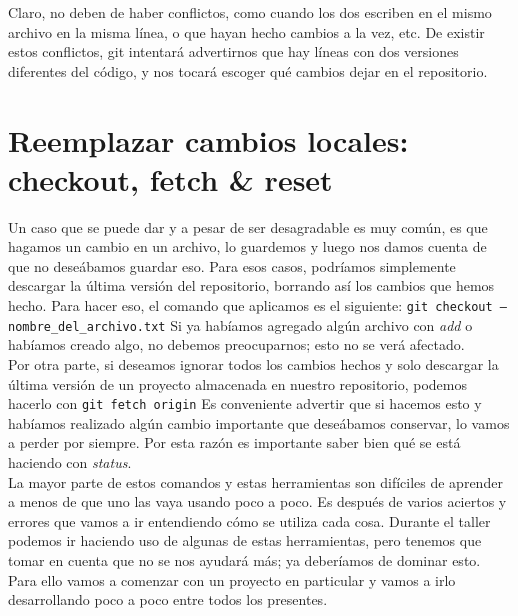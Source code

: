 \documentclass[10pt,letterpaper]{article}
\newcommand{\inlinecode}[1]{
\colorbox{light-gray}{\texttt{#1}}
}
\begin{document}
Claro, no deben de haber conflictos, como cuando los dos escriben en el mismo archivo en la misma l\'inea, o que hayan hecho cambios a la vez, etc. De existir estos conflictos, git intentar\'a advertirnos que hay l\'ineas con dos versiones diferentes del c\'odigo, y nos tocar\'a escoger qu\'e cambios dejar en el repositorio.

\section{Reemplazar cambios locales: checkout, fetch \& reset}
Un caso que se puede dar y a pesar de ser desagradable es muy com\'un, es que hagamos un cambio en un archivo, lo guardemos y luego nos damos cuenta de que no dese\'abamos guardar eso. Para esos casos, podr\'iamos simplemente descargar la \'ultima versi\'on del repositorio, borrando as\'i los cambios que hemos hecho. Para hacer eso, el comando que aplicamos es el siguiente: \inlinecode{git checkout -- nombre\_del\_archivo.txt} Si ya hab\'iamos agregado alg\'un archivo con \textit{add} o hab\'iamos creado algo, no debemos preocuparnos; esto no se ver\'a afectado.\\

Por otra parte, si deseamos ignorar todos los cambios hechos y solo descargar la \'ultima versi\'on de un proyecto almacenada en nuestro repositorio, podemos hacerlo con \inlinecode{git fetch origin} Es conveniente advertir que si hacemos esto y hab\'iamos realizado alg\'un cambio importante que dese\'abamos conservar, lo vamos a perder por siempre. Por esta raz\'on es importante saber bien qu\'e se est\'a haciendo con \textit{status}.\\

La mayor parte de estos comandos y estas herramientas son dif\'iciles de aprender a menos de que uno las vaya usando poco a poco. Es despu\'es de varios aciertos y errores que vamos a ir entendiendo c\'omo se utiliza cada cosa. Durante el taller podemos ir haciendo uso de algunas de estas herramientas, pero tenemos que tomar en cuenta que no se nos ayudar\'a m\'as; ya deber\'iamos de dominar esto. Para ello vamos a comenzar con un proyecto en particular y vamos a irlo desarrollando poco a poco entre todos los presentes.
\end{document}
